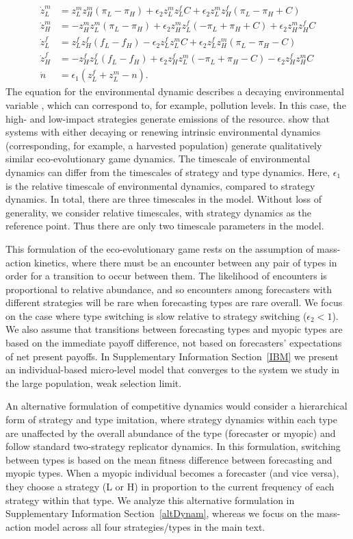 \documentclass{article}
\begin{document}
\begin{align}
\dot{z}_L^m &= z_L^m z_H^m (\pi_L-\pi_H) + \epsilon_2 z_L^m z_L^f C + \epsilon_2 z_L^m z_H^f (\pi_L-\pi_H+C)\\
\dot{z}_H^m &= - z_H^m z_L^m (\pi_L-\pi_H) + \epsilon_2 z_H^m z_L^f (-\pi_L+\pi_H+C) + \epsilon_2 z_H^m z_H^f C\\
\dot{z}_L^f &= z_L^f z_H^f (f_L-f_H) - \epsilon_2 z_L^f z_L^m C + \epsilon_2 z_L^f z_H^m (\pi_L-\pi_H-C)\\
\dot{z}_H^f &= -z_H^f z_L^f (f_L-f_H) + \epsilon_2 z_H^f z_L^m (-\pi_L+\pi_H-C) - \epsilon_2 z_H^f z_H^m C\\
\dot{n}_{~} &= \epsilon_1(z_L^f+z_L^m-n).
\end{align}
The equation for the environmental dynamic describes a decaying environmental variable \citep{tilman2020}, which can correspond to, for example, pollution levels. In this case, the high- and low-impact strategies generate emissions of the resource. \citet{tilman2020} show that systems with either decaying or renewing intrinsic environmental dynamics (corresponding, for example, a harvested population) generate qualitatively similar eco-evolutionary game dynamics. The timescale of environmental dynamics can differ from the timescales of strategy and type dynamics. Here, $\epsilon_1$ is the relative timescale of environmental dynamics, compared  to strategy dynamics. In total, there are three timescales in the model. Without loss of generality, we consider relative timescales, with strategy dynamics as the reference point. Thus there are only two timescale parameters in the model.

This formulation of the eco-evolutionary game rests on the assumption of mass-action kinetics, where there must be an encounter between any pair of types in order for a transition to occur between them. The likelihood of encounters is proportional to relative abundance, and so encounters among forecasters with different strategies will be rare when forecasting types are rare overall. We focus on the case where type switching is slow relative to strategy switching ($\epsilon_2<1$). We also assume that transitions between forecasting types and myopic types are based on the immediate payoff difference, not based on forecasters' expectations of net present payoffs. In Supplementary Information Section~\ref{IBM} we present an individual-based micro-level model that converges to the system we study in the large population, weak selection limit. 

An alternative formulation of competitive dynamics would consider a hierarchical form of strategy and type imitation, where strategy dynamics within each type are unaffected by the overall abundance of the type (forecaster or myopic) and follow standard two-strategy replicator dynamics. In this formulation, switching between types is based on the mean fitness difference between forecasting and myopic types. When a myopic individual becomes a forecaster (and vice versa), they  choose a strategy (L or H) in proportion to the current frequency of each strategy within that type. We analyze this alternative formulation in Supplementary Information Section~\ref{altDynam}, whereas we focus on the mass-action model across all four strategies/types in the main text.
\end{document}
